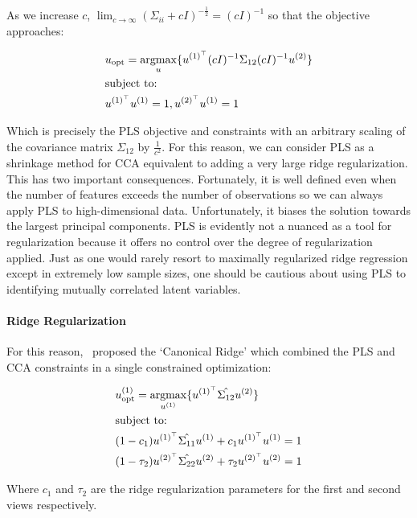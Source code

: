 As we increase $c$, $\lim_{c \to \infty} (\Sigma_{ii}+ c I)^{-\frac{1}{2}}= (c I)^{-1}$ so that the objective approaches:

\begin{align}
     & u_{\text{opt}}=\underset{u}{\mathrm{argmax}}\{ u^{(1)^{\top}}(c I)^{-1}\Sigma_{12}(c I)^{-1}u^{(2)} \} \\
        & \text{subject to:} \notag \\
        & u^{(1)^{\top}}u^{(1)}=1, u^{(2)^{\top}}u^{(1)}=1 \notag
\end{align}

Which is precisely the PLS objective and constraints with an arbitrary scaling of the covariance matrix $\Sigma_{12}$ by $\frac{1}{c^2}$.
For this reason, we can consider PLS as a shrinkage method for CCA equivalent to adding a very large ridge regularization.
This has two important consequences.
Fortunately, it is well defined even when the number of features exceeds the number of observations so we can always apply PLS to high-dimensional data.
Unfortunately, it biases the solution towards the largest principal components.
PLS is evidently not a nuanced as a tool for regularization because it offers no control over the degree of regularization applied.
Just as one would rarely resort to maximally regularized ridge regression except in extremely low sample sizes, one should be cautious about using PLS to identifying mutually correlated latent variables.

\paragraph{Ridge Regularization}

For this reason,~\cite{vinod1976canonical} proposed the `Canonical Ridge' which combined the PLS and CCA constraints in a single constrained optimization:

\begin{align}
     & u^{(1)}_{\text{opt}} = \underset{u^{(1)}}{\mathrm{argmax}} \{ u^{(1)^{\top}} \hat{\Sigma_{12}} u^{(2)} \} \\
     & \text{subject to:} \notag \\
     & (1 - c_1) u^{(1)^{\top}} \hat{\Sigma_{11}} u^{(1)} + c_1 u^{(1)^{\top}} u^{(1)} = 1 \notag \\
     & (1 - \tau_2) u^{(2)^{\top}} \hat{\Sigma_{22}} u^{(2)} + \tau_2 u^{(2)^{\top}} u^{(2)} = 1 \notag
\end{align}

Where $c_1$ and $\tau_2$ are the ridge regularization parameters for the first and second views respectively.

